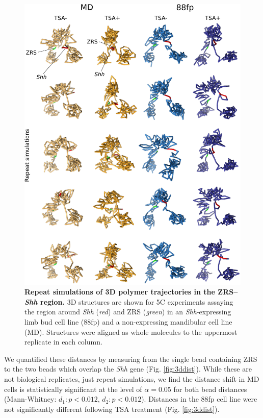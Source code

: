 \documentclass[a4paper,11pt,oneside]{book}
\begin{document}
\begin{figure}
\begin{center} 
\includegraphics[width=5.45in]{3dreps.pdf}
\captionsetup{width=\textwidth} 
\caption[ Repeat simulations of 3D polymer trajectories in the ZRS--\emph{Shh} region. ]{ {\bf Repeat simulations of 3D polymer trajectories in the ZRS--\emph{Shh} region. }
3D structures are shown for 5C experiments assaying the region around \emph{Shh} (\emph{red}) and ZRS (\emph{green}) in an \emph{Shh}-expressing limb bud cell line (88fp) and a non-expressing mandibular cell line (MD). Structures were aligned as whole molecules to the uppermost replicate in each column.
}\label{fig:3dreps}
\end{center} 
\end{figure} 

We quantified these distances by measuring from the single bead containing ZRS to the two beads which overlap the \emph{Shh} gene (Fig. \ref{fig:3ddist}). While these are not biological replicates, just repeat simulations, we find the distance shift in MD cells is statistically significant at the level of $\alpha = 0.05$ for both bead distances (Mann-Whitney: $d_1: p < 0.012$, $d_2: p < 0.012 $). Distances in the 88fp cell line were not significantly different following TSA treatment (Fig. \ref{fig:3ddist}).
\end{document}
